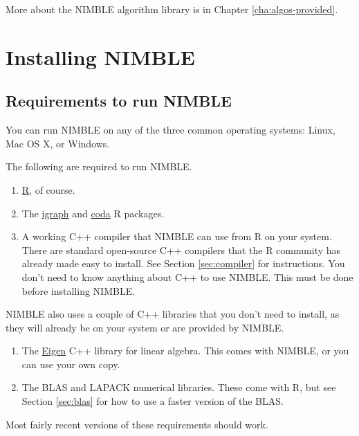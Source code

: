 \documentclass[12pt,oneside]{book}\usepackage[]{graphicx}\usepackage[]{color}
\begin{document}
More about the NIMBLE algorithm library is in Chapter \ref{cha:algos-provided}.





\chapter{Installing NIMBLE}
\label{cha:installing-nimble}

\section{Requirements to run NIMBLE}
\label{sec:requ-run-nimble}

You can run NIMBLE on any of the three common operating systems: Linux, Mac OS X, or Windows. 

The following are required to run NIMBLE.

\begin{enumerate}
\item \href{http://www.cran.r-project.org}{R}, of course.
\item The \href{http://www.cran.r-project.org/web/packages/igraph/index.html}{igraph} and  \href{http://www.cran.r-project.org/web/packages/coda/index.html}{coda} R packages.
\item A working C++ compiler that NIMBLE can use from R on your system.  There are
  standard open-source C++ compilers that the R community has already
  made easy to install.  See Section \ref{sec:compiler} for
  instructions.  You don't need to know anything about C++ to use
  NIMBLE.  This must be done before installing NIMBLE.

\end{enumerate}

NIMBLE also uses a couple of C++ libraries that you don't need to install, as they will already be on your system or are provided by NIMBLE.
\begin{enumerate}
\item The \href{http://eigen.tuxfamily.org}{Eigen} C++ library
  for linear algebra.  This comes with NIMBLE, or you can use your own copy.
\item The BLAS and LAPACK numerical libraries.  These come with
  R, but see Section \ref{sec:blas} for how to use a faster version of the BLAS.
\end{enumerate}

Most fairly recent versions of these requirements should work. 
\end{document}
